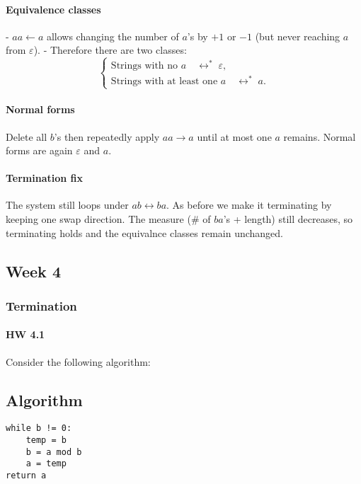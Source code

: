 \documentclass{article}
\theoremstyle{theorem}
\theoremstyle{definition}
\theoremstyle{remark}
\begin{document}
\paragraph{Equivalence classes}
- $aa \leftarrow a$ allows changing the number of $a$'s by $+1$ or $-1$ (but never reaching $a$ from $\varepsilon$).
- Therefore there are two classes:
\[
\begin{cases}
\text{Strings with no $a$} \quad \leftrightarrow^* \; \varepsilon, \\
\text{Strings with at least one $a$} \quad \leftrightarrow^* \; a.
\end{cases}
\]

\paragraph{Normal forms}
Delete all $b$'s then repeatedly apply $aa \to a$ until at most one $a$ remains.
Normal forms are again $\varepsilon$ and $a$.

\paragraph{Termination fix}
The system still loops under $ab \leftrightarrow ba$. As before we make it terminating by keeping one swap direction. The measure (\# of $ba$'s + length) still decreases, so terminating holds and the equivalnce classes remain unchanged.

\subsection{Week 4}

\subsubsection{Termination}

\paragraph{HW 4.1}
Consider the following algorithm:
\subsection*{Algorithm}
\begin{verbatim}
while b != 0:
    temp = b
    b = a mod b
    a = temp
return a
\end{verbatim}
\end{document}
